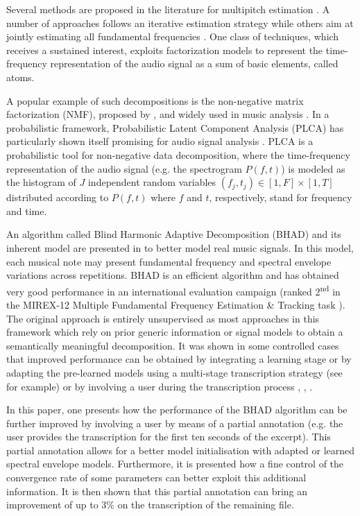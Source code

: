 \documentclass{article}
\begin{document}
Several methods are proposed in the literature for multipitch estimation \cite{Christensen2009_Morgan}. A number of approaches follows an iterative estimation strategy \cite{Klapuri2008} while others aim at jointly estimating all fundamental frequencies \cite{Davy2006, Vincent2010_IEEE, Fuentes2012_EUSIPCO}. One class of techniques, which receives a sustained interest, exploits factorization models to represent the time-frequency representation of the audio signal as a sum of basic elements, called atoms.

A popular example of such decompositions is the non-negative matrix factorization (NMF), proposed by \cite{Lee99}, and widely used in music analysis \cite{Durrieu2011, Smaragdis03, Virtanen2008, Dessein10}.
In a probabilistic framework, Probabilistic Latent Component Analysis (PLCA) has particularly shown itself promising for audio signal analysis \cite{Benetos11c,Smaragdis06,Smaragdis08}.
PLCA is a probabilistic tool for non-negative data decomposition, where the time-frequency representation of the audio signal (e.g. the spectrogram $P(f,t)$) is modeled as the histogram of $J$ independent random variables $(f_j,t_j) \in \left[ 1,F \right] \times \left[ 1,T \right]$ distributed according to $P(f,t)$ where $f$ and $t$, respectively, stand for frequency and time.


An algorithm called Blind Harmonic Adaptive Decomposition (BHAD) and its inherent model are presented in \cite{Fuentes2012_EUSIPCO, Fuentes2013_PhD} to better model real music signals. In this model, each musical note may present fundamental frequency and spectral envelope variations across repetitions. BHAD is an efficient algorithm and has obtained very good performance in an international evaluation campaign (ranked 2\textsuperscript{nd} in the MIREX-12 Multiple Fundamental Frequency Estimation \& Tracking task \cite{MIREX2012}).
The original approach is entirely unsupervised as most approaches in this framework which rely on prior generic information or signal models to obtain a semantically meaningful decomposition. It was shown in some controlled cases that improved performance can be obtained by integrating a learning stage or by adapting the pre-learned models using a multi-stage transcription strategy (see \cite{BenetosISMIR2014} for example) or by involving a user during the transcription process \cite{Kirchhoff13}, \cite{ozerov2012general}, \cite{BryanEtAl_2013_SourSepaOfPoly}.

In this paper, one presents how the performance of the BHAD algorithm can be further improved by involving a user by means of a partial annotation (e.g. the user provides the transcription for the first ten seconds of the excerpt). This partial annotation allows for a better model initialisation with adapted or learned spectral envelope models. Furthermore, it is presented how a fine control of the convergence rate of some parameters can better exploit this additional information. It is then shown that this partial annotation can bring an improvement of up to 3\% on the transcription of the remaining file.
\end{document}
